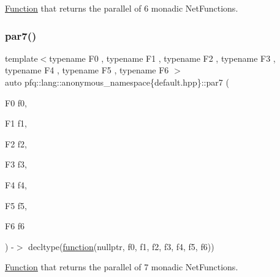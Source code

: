 \hyperlink{structpfq_1_1lang_1_1Function}{Function} that returns the parallel of 6 monadic Net\+Functions. 

\mbox{\label{namespacepfq_1_1lang_1_1anonymous__namespace_02default_8hpp_03_a0dfd1f474b684ccae730fc9ecf182c91}} 
\subsubsection{\texorpdfstring{par7()}{par7()}}
{\footnotesize\ttfamily template$<$typename F0 , typename F1 , typename F2 , typename F3 , typename F4 , typename F5 , typename F6 $>$ \\
auto pfq\+::lang\+::anonymous\+\_\+namespace\{default.\+hpp\}\+::par7 (\begin{DoxyParamCaption}\item[{F0}]{f0,  }\item[{F1}]{f1,  }\item[{F2}]{f2,  }\item[{F3}]{f3,  }\item[{F4}]{f4,  }\item[{F5}]{f5,  }\item[{F6}]{f6 }\end{DoxyParamCaption}) -\/$>$ decltype(\hyperlink{namespacepfq_1_1lang_a1a4638059d700ae08d0ca63886ff2bb3}{function}(nullptr, f0, f1, f2, f3, f4, f5, f6))
        }



\hyperlink{structpfq_1_1lang_1_1Function}{Function} that returns the parallel of 7 monadic Net\+Functions. 

\mbox{\label{namespacepfq_1_1lang_1_1anonymous__namespace_02default_8hpp_03_abea4fd8a8c302e06a480d19d3e9b1165}} 
